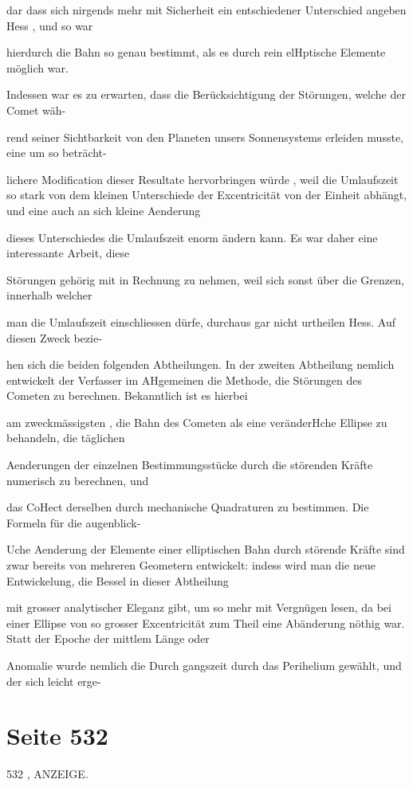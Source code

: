 \documentclass[10pt,a4paper]{article}
\begin{document}
dar dass sich nirgends mehr mit Sicherheit ein entschiedener Unterschied angeben Hess , und so war

hierdurch die Bahn so genau bestimmt, als es durch rein elHptische Elemente möglich war.

Indessen war es zu erwarten, dass die Berücksichtigung der Störungen, welche der Comet wäh-

rend seiner Sichtbarkeit von den Planeten unsers Sonnensystems erleiden musste, eine um so beträcht-

lichere Modification dieser Resultate hervorbringen würde , weil die Umlaufszeit so stark von dem kleinen Unterschiede der Excentricität von der Einheit abhängt, und eine auch an sich kleine Aenderung

dieses Unterschiedes die Umlaufszeit enorm ändern kann. Es war daher eine interessante Arbeit, diese

Störungen gehörig mit in Rechnung zu nehmen, weil sich sonst über die Grenzen, innerhalb welcher

man die Umlaufszeit einschliessen dürfe, durchaus gar nicht urtheilen Hess. Auf diesen Zweck bezie-

hen sich die beiden folgenden Abtheilungen. In der zweiten Abtheilung nemlich entwickelt der Verfasser im AHgemeinen die Methode, die Störungen des Cometen zu berechnen. Bekanntlich ist es hierbei

am zweckmässigsten , die Bahn des Cometen als eine veränderHche Ellipse zu behandeln, die täglichen

Aenderungen der einzelnen Bestimmungsstücke durch die störenden Kräfte numerisch zu berechnen, und

das CoHect derselben durch mechanische Quadraturen zu bestimmen. Die Formeln für die augenblick-

Uche Aenderung der Elemente einer elliptischen Bahn durch störende Kräfte sind zwar bereits von mehreren Geometern entwickelt: indess wird man die neue Entwickelung, die Bessel in dieser Abtheilung

mit grosser analytischer Eleganz gibt, um so mehr mit Vergnügen lesen, da bei einer Ellipse von so grosser Excentricität zum Theil eine Abänderung nöthig war. Statt der Epoche der mittlem Länge oder

Anomalie wurde nemlich die Durch gangszeit durch das Perihelium gewählt, und der sich leicht erge-


\newpage
\section*{Seite 532}
532 , ANZEIGE.
\end{document}
